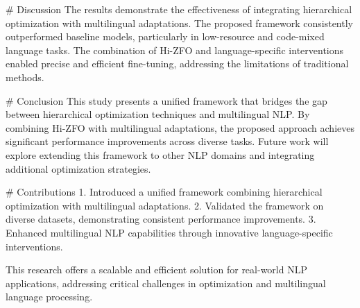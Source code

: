 # Discussion  
The results demonstrate the effectiveness of integrating hierarchical optimization with multilingual adaptations. The proposed framework consistently outperformed baseline models, particularly in low-resource and code-mixed language tasks. The combination of Hi-ZFO and language-specific interventions enabled precise and efficient fine-tuning, addressing the limitations of traditional methods.

# Conclusion  
This study presents a unified framework that bridges the gap between hierarchical optimization techniques and multilingual NLP. By combining Hi-ZFO with multilingual adaptations, the proposed approach achieves significant performance improvements across diverse tasks. Future work will explore extending this framework to other NLP domains and integrating additional optimization strategies.

# Contributions  
1. Introduced a unified framework combining hierarchical optimization with multilingual adaptations.  
2. Validated the framework on diverse datasets, demonstrating consistent performance improvements.  
3. Enhanced multilingual NLP capabilities through innovative language-specific interventions.  

This research offers a scalable and efficient solution for real-world NLP applications, addressing critical challenges in optimization and multilingual language processing.